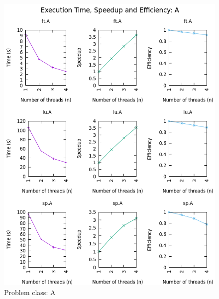 \documentclass[12pt]{article}
\begin{document}
\begin{figure}[h!]
	\centering
	\includegraphics[width=0.9\linewidth]{A.PTSE.png}
	\caption{Problem class: A}
	\label{fig:a}
\end{figure}

\newpage
\end{document}
